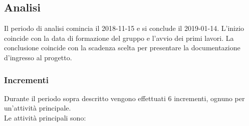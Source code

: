 \subsection{Analisi}

Il periodo di analisi comincia il 2018-11-15 e si conclude il 2019-01-14. L'inizio coincide con la data di formazione del gruppo e l'avvio dei primi lavori. La conclusione coincide con la scadenza scelta per presentare la documentazione d'ingresso al progetto.

\subsubsection{Incrementi}
Durante il periodo sopra descritto vengono effettuati 6 incrementi, ognuno per un'attività principale.\\
Le attività principali sono:
